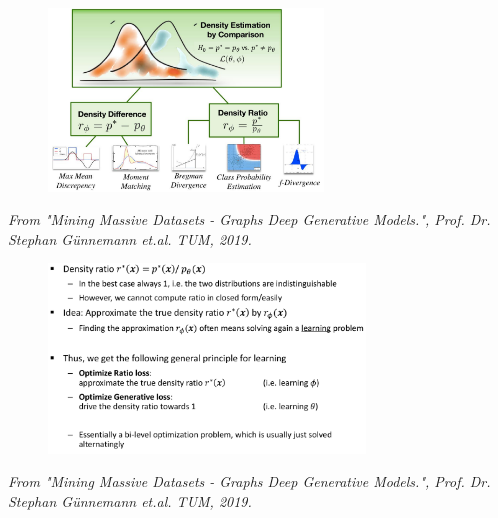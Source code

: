 \documentclass{tum-presentation}
\begin{document}
\begin{frame}
	\begin{figure}
		\centering
		\includegraphics[width=0.65\textwidth,keepaspectratio=true]{tum-resources/images/gan_3.png}
		\label{fig:gan_3}
	\end{figure}
\begin{flushright}
	\textit{	From "Mining Massive Datasets - Graphs Deep Generative Models.", Prof. Dr. Stephan Günnemann et.al. TUM, 2019. }
\end{flushright}
\end{frame}

\begin{frame}
	\begin{figure}
		\centering
		\includegraphics[width=0.75\textwidth,keepaspectratio=true]{tum-resources/images/gan_4.png}
		\label{fig:gan_4}
	\end{figure}
\begin{flushright}
	\textit{	From "Mining Massive Datasets - Graphs Deep Generative Models.", Prof. Dr. Stephan Günnemann et.al. TUM, 2019. }
\end{flushright}
\end{frame}
\end{document}
